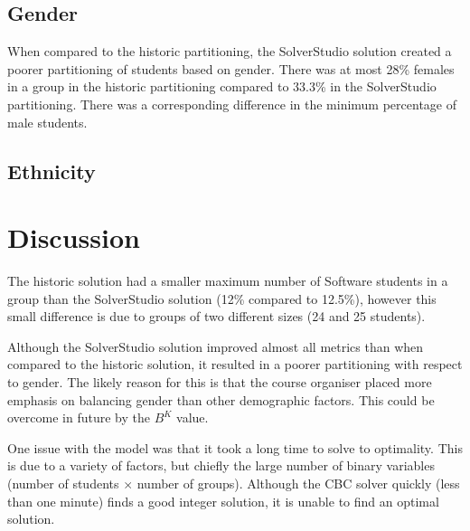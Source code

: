 \documentclass[12pt]{ORSNZ}
\begin{document}
\subsection{Gender}
When compared to the historic partitioning, the SolverStudio solution created a poorer partitioning of students based on gender. There was at most 28\% females in a group in the historic partitioning compared to 33.3\% in the SolverStudio partitioning. There was a corresponding difference in the minimum percentage of male students.

\subsection{Ethnicity}

\section{Discussion}

The historic solution had a smaller maximum number of Software students in a group than the SolverStudio solution (12\% compared to 12.5\%), however this small difference is due to groups of two different sizes (24 and 25 students). 

Although the SolverStudio solution improved almost all metrics than when compared to the historic solution, it resulted in a poorer partitioning with respect to gender. The likely reason for this is that the course organiser placed more emphasis on balancing gender than other demographic factors. This could be overcome in future by the $B^K$ value.

One issue with the model was that it took a long time to solve to optimality. This is due to a variety of factors, but chiefly the large number of binary variables (number of students $\times$ number of groups). Although the CBC solver quickly (less than one minute) finds a good integer solution, it is unable to find an optimal solution. 


\end{document}
